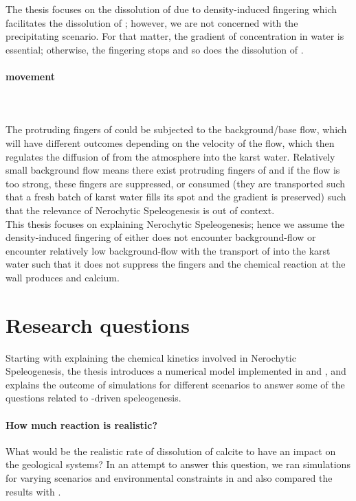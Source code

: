 The thesis focuses on the dissolution of  due to density-induced fingering which facilitates the dissolution of ; 
however, we are not concerned with the precipitating scenario. For that matter, the gradient of  concentration in water is essential; otherwise, the fingering 
stops and so does the dissolution of .

\newpage
\paragraph*{ movement}\mbox{}\\ \\
The protruding fingers of  could be subjected to the background/base flow, which will have different outcomes depending on 
the velocity of the flow, which then regulates the diffusion of  from the atmosphere into the karst water. Relatively small 
background flow means there exist protruding fingers of  and if the flow is too strong, these fingers are suppressed, or 
consumed (they are transported such that a fresh batch of karst water fills its spot and the gradient is preserved) such 
that the relevance of Nerochytic Speleogenesis is out of context. \\

This thesis focuses on explaining Nerochytic Speleogenesis; hence we assume the density-induced fingering of  either does not encounter 
background-flow or encounter relatively low background-flow with the transport of  into the karst water such that it does not suppress 
the fingers and the chemical reaction at the wall produces  and calcium.

\section {Research questions}
Starting with explaining the chemical kinetics involved in Nerochytic Speleogenesis, the thesis introduces a numerical model 
implemented in \DuMuX and \MATLAB , and explains the outcome of simulations for different scenarios to answer some of the questions 
related to -driven speleogenesis.\\

\paragraph*{How much reaction is realistic?} What would be the realistic rate of dissolution of calcite to have an impact 
on the geological systems? In an attempt to answer this question, we ran simulations for varying scenarios and environmental constraints in \DuMuX and
also compared the results with \MATLAB. 

